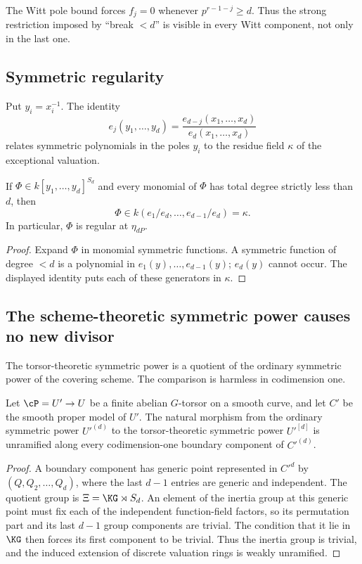\begin{rem*}\label{rem:realization_Wr_sanity}
The Witt pole bound forces $f_j=0$ whenever $p^{r-1-j}\geq d$. Thus the
strong restriction imposed by ``break $<d$'' is visible in every Witt
component, not only in the last one.
\end{rem*}

\subsection{Symmetric regularity}

Put $y_i=x_i^{-1}$. The identity
\[
   e_j(y_1,\dots,y_d)=\frac{e_{d-j}(x_1,\dots,x_d)}{e_d(x_1,\dots,x_d)}
\]
relates symmetric polynomials in the poles $y_i$ to the residue field
$\kappa$ of the exceptional valuation.

\begin{lemma}\label{lemma:symmetric_regularity}
If $\Phi\in k[y_1,\dots,y_d]^{S_d}$ and every monomial of $\Phi$ has total
degree strictly less than $d$, then
\[
    \Phi\in k(e_1/e_d,\dots,e_{d-1}/e_d)=\kappa.
\]
In particular, $\Phi$ is regular at $\eta_{dP}$.
\end{lemma}
\begin{proof}
Expand $\Phi$ in monomial symmetric functions. A symmetric function of degree
$<d$ is a polynomial in $e_1(y),\dots,e_{d-1}(y)$; $e_d(y)$ cannot occur.
The displayed identity puts each of these generators in $\kappa$.
\end{proof}

\subsection{The scheme-theoretic symmetric power causes no new divisor}

The torsor-theoretic symmetric power is a quotient of the ordinary symmetric
power of the covering scheme. The comparison is harmless in codimension one.

\begin{lemma}\label{lemma:torsor_unramified_codim_one}
Let $\cP=U'\to U$ be a finite abelian $G$-torsor on a smooth curve, and let
$C'$ be the smooth proper model of $U'$. The natural morphism from the ordinary
symmetric power $U'^{(d)}$ to the torsor-theoretic symmetric power
$U'^{[d]}$ is unramified along every codimension-one boundary component of
$C'^{(d)}$.
\end{lemma}
\begin{proof}
A boundary component has generic point represented in $C'^d$ by
$(Q,Q_2,\dots,Q_d)$, where the last $d-1$ entries are generic and independent.
The quotient group is $\Xi=\KG\rtimes S_d$. An element of the inertia group at
this generic point must fix each of the independent function-field factors,
so its permutation part and its last $d-1$ group components are trivial. The
condition that it lie in $\KG$ then forces its first component to be trivial.
Thus the inertia group is trivial, and the induced extension of discrete
valuation rings is weakly unramified.
\end{proof}

